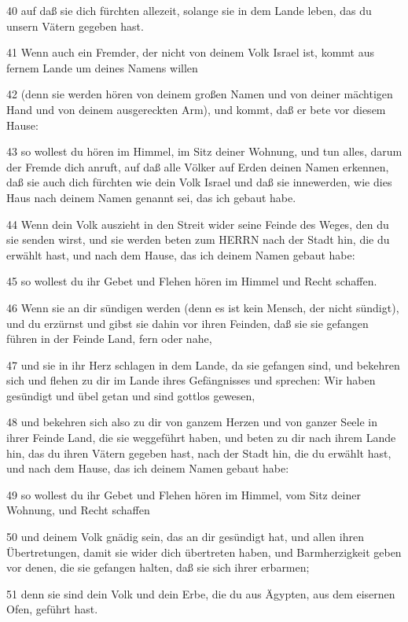\par 40 auf daß sie dich fürchten allezeit, solange sie in dem Lande leben, das du unsern Vätern gegeben hast.
\par 41 Wenn auch ein Fremder, der nicht von deinem Volk Israel ist, kommt aus fernem Lande um deines Namens willen
\par 42 (denn sie werden hören von deinem großen Namen und von deiner mächtigen Hand und von deinem ausgereckten Arm), und kommt, daß er bete vor diesem Hause:
\par 43 so wollest du hören im Himmel, im Sitz deiner Wohnung, und tun alles, darum der Fremde dich anruft, auf daß alle Völker auf Erden deinen Namen erkennen, daß sie auch dich fürchten wie dein Volk Israel und daß sie innewerden, wie dies Haus nach deinem Namen genannt sei, das ich gebaut habe.
\par 44 Wenn dein Volk auszieht in den Streit wider seine Feinde des Weges, den du sie senden wirst, und sie werden beten zum HERRN nach der Stadt hin, die du erwählt hast, und nach dem Hause, das ich deinem Namen gebaut habe:
\par 45 so wollest du ihr Gebet und Flehen hören im Himmel und Recht schaffen.
\par 46 Wenn sie an dir sündigen werden (denn es ist kein Mensch, der nicht sündigt), und du erzürnst und gibst sie dahin vor ihren Feinden, daß sie sie gefangen führen in der Feinde Land, fern oder nahe,
\par 47 und sie in ihr Herz schlagen in dem Lande, da sie gefangen sind, und bekehren sich und flehen zu dir im Lande ihres Gefängnisses und sprechen: Wir haben gesündigt und übel getan und sind gottlos gewesen,
\par 48 und bekehren sich also zu dir von ganzem Herzen und von ganzer Seele in ihrer Feinde Land, die sie weggeführt haben, und beten zu dir nach ihrem Lande hin, das du ihren Vätern gegeben hast, nach der Stadt hin, die du erwählt hast, und nach dem Hause, das ich deinem Namen gebaut habe:
\par 49 so wollest du ihr Gebet und Flehen hören im Himmel, vom Sitz deiner Wohnung, und Recht schaffen
\par 50 und deinem Volk gnädig sein, das an dir gesündigt hat, und allen ihren Übertretungen, damit sie wider dich übertreten haben, und Barmherzigkeit geben vor denen, die sie gefangen halten, daß sie sich ihrer erbarmen;
\par 51 denn sie sind dein Volk und dein Erbe, die du aus Ägypten, aus dem eisernen Ofen, geführt hast.
